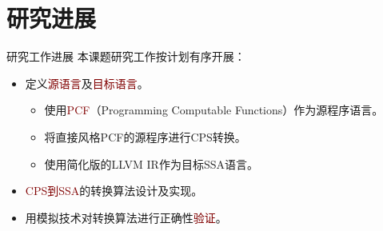 

\section{研究进展}

\begin{frame}{研究工作进展}
  本课题研究工作按计划有序开展：
  \vspace{2ex}
  \begin{itemize}
    \item 定义\textcolor{Maroon}{源语言}及\textcolor{Maroon}{目标语言}。
      \begin{itemize}
        \item 使用\textcolor{Maroon}{PCF}（Programming Computable Functions）作为源程序语言。
        \item 将直接风格PCF的源程序进行CPS转换。
        \item 使用简化版的LLVM IR作为目标SSA语言。
      \end{itemize}
    \item \textcolor{Maroon}{CPS到SSA}的转换算法设计及实现。
    \item 用模拟技术对转换算法进行正确性\textcolor{Maroon}{验证}。
  \end{itemize}
\end{frame}


